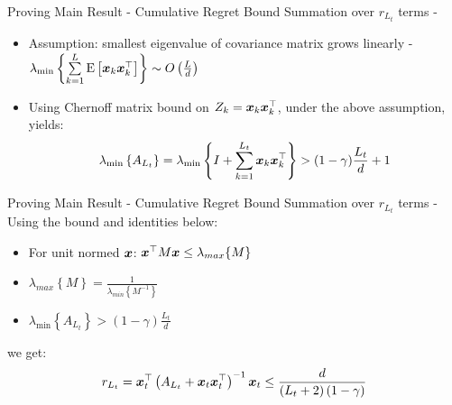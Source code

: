 \documentclass{beamer}
\begin{document}
\begin{frame}{Proving Main Result - Cumulative Regret Bound}
Summation over $r_{L_t}$ terms - \newline
\begin{itemize}
\item Assumption: smallest eigenvalue of covariance matrix grows linearly - $\lambda_{\min}\left\{\sum\limits_{k=1}^{L}{\rm E}\left[{{\boldsymbol{x}}_{k}{{\boldsymbol{x}}}^{\top}_{k}}\right]\right\}\sim O\left(\frac{L}{d}\right)$\newline 
\item Using Chernoff matrix bound on $Z_k={\boldsymbol{x}}_{k}{{\boldsymbol{x}}}^{\top}_{k}$, under the above assumption, yields:
\begin{equation*}
\lambda_{\min}\left\{A_{L_t}\right\}=\lambda_{\min}\left\{I+\sum\limits_{k=1}^{L_t} {\boldsymbol{x}}_{k}{{\boldsymbol{x}}}^{\top}_{k}\right\}>(1-\gamma)\frac{L_t}{d}+1
\label{lamda_min_bound}
\end{equation*}
\end{itemize}
\end{frame}


\begin{frame}{Proving Main Result - Cumulative Regret Bound}
Summation over $r_{L_t}$ terms - \newline\newline
Using the bound and identities below:\newline
\begin{itemize}
\item For unit normed ${\boldsymbol{x}}$: ${{\boldsymbol{x}}}^{\top} M{\boldsymbol{x}}\leq \lambda_{max}\{M\}$
\item $\lambda_{max}\left\{M\right\}=\frac{1}{\lambda_{min}\left\{M^{-1}\right\}}$
\item $\lambda_{\min}\left\{A_{L_t}\right\}>\left(1-\gamma\right)\frac{L_t}{d}$\newline
\end{itemize}
we get:
\begin{eqnarray*}
r_{L_t}={{\boldsymbol{x}}}^{\top}_{t}\left(A_{L_t}+{\boldsymbol{x}}_{t}{{\boldsymbol{x}}}^{\top}_{t}\right)^{-1}{\boldsymbol{x}}_{t}\leq\frac{d}{\left(L_t+2\right)\left(1-\gamma\right)}
\end{eqnarray*}
\end{frame}
\end{document}
